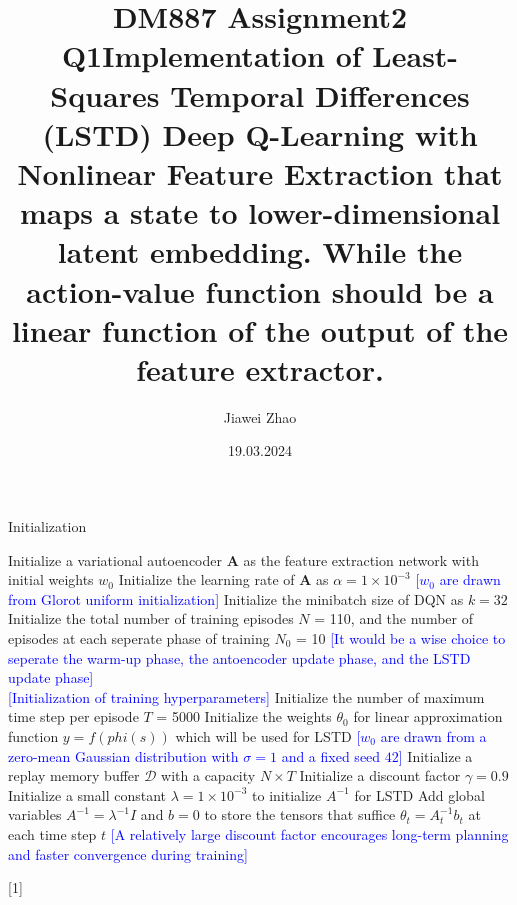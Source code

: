 \documentclass[a4paper,12pt,oneside]{article}
\numberwithin{equation}{section}
\begin{document}
\title{DM887 Assignment2 Q1}
\author{Jiawei Zhao}
\date{19.03.2024}
\maketitle
\title {Implementation of Least-Squares Temporal Differences (LSTD) Deep Q-Learning with Nonlinear Feature Extraction that maps a state to lower-dimensional latent embedding. While the action-value function should be a linear function of the output of the feature extractor.}

\newcommand{\mycomment}[1]{{\fontfamily{lmss}\selectfont\textcolor{blue}{[#1]}}} %
    \begin{algorithm}
        \begin{algorithmic}[1]
        \caption{Initialization}
        \State Initialize a variational autoencoder $\mathbf{A}$ as the feature extraction network with initial weights \(w_0\)
        \State Initialize the learning rate of $\mathbf{A}$ as $\alpha=1 \times 10^{-3}$ 
        \mycomment {\(w_0\) are drawn from Glorot uniform initialization}
        \State Initialize the minibatch size of DQN as \(k=32\) 
        \State Initialize the total number of training episodes \(N\) = 110, and the number of episodes at each seperate phase of training \(N_0\) = 10
        \mycomment {It would be a wise choice to seperate the warm-up phase, the antoencoder update phase, and the LSTD update phase}
        \\
        \mycomment {Initialization of training hyperparameters}
        \State Initialize the number of maximum time step per episode \(T\) = 5000
        \State Initialize the weights $\theta_0$ for linear approximation function $y = f(phi(s))$ which will be used for LSTD
        \mycomment {\(w_0\) are drawn from a zero-mean Gaussian distribution with $\sigma=1$ and a fixed seed $42$}
        \State Initialize a replay memory buffer $\mathcal{D}$ with a capacity \(N \times T\)
        \State Initialize a discount factor $\gamma=0.9$ 
        \State Initialize a small constant $\lambda=1 \times 10^{-3}$ to initialize $A^{-1}$ for LSTD  
        \State Add global variables $A^{-1} = \lambda^{-1}I$ and $b=0$ to store the tensors that suffice $\theta_t = A_t^{-1} b_t$ at each time step \(t\)
        \mycomment{A relatively large discount factor encourages long-term planning and faster convergence during training}
        \end{algorithmic}[1]
    \end{algorithm}
        
\end{document}
